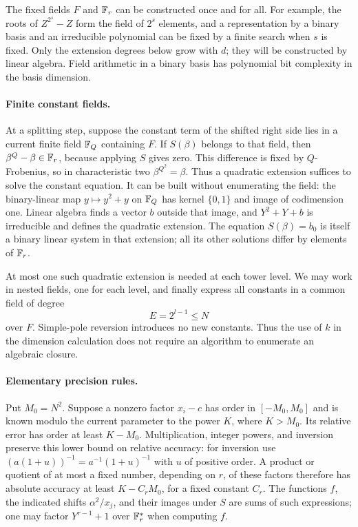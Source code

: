 The fixed fields $F$ and $\mathbb F_r$ can be constructed once and for all.
For example, the roots of $Z^{2^s}-Z$ form the field of $2^s$ elements,
and a representation by a binary basis and an irreducible polynomial
can be fixed by a finite search when $s$ is fixed.  Only the extension
degrees below grow with $d$; they will be constructed by linear algebra.
Field arithmetic in a binary basis has polynomial bit complexity in
the basis dimension.

\paragraph{Finite constant fields.}
At a splitting step, suppose the constant term of the shifted right
side lies in a current finite field $\mathbb F_Q$ containing $F$.  If
$S(\beta)$ belongs to that field, then
$\beta^Q-\beta\in\mathbb F_r$, because applying $S$ gives zero.  This difference
is fixed by $Q$-Frobenius, so in characteristic two
$\beta^{Q^2}=\beta$.  Thus a quadratic extension suffices to solve the
constant equation.  It can be built without enumerating the field:
the binary-linear map $y\mapsto y^2+y$ on $\mathbb F_Q$ has kernel
$\{0,1\}$ and image of codimension one.  Linear algebra finds a vector
$b$ outside that image, and $Y^2+Y+b$ is irreducible and defines the
quadratic extension.  The equation $S(\beta)=b_0$ is itself a binary
linear system in that extension; all its other solutions differ by
elements of $\mathbb F_r$.

At most one such quadratic extension is needed at each tower level.
We may work in nested fields, one for each level, and finally express
all constants in a common field of degree
\begin{equation}\label{eq:pencil-constant-degree}
 E=2^{l-1}\leq N
\end{equation}
over $F$.  Simple-pole reversion introduces no new constants.
Thus the use of $k$ in the dimension calculation does not require an
algorithm to enumerate an algebraic closure.

\paragraph{Elementary precision rules.}
Put $M_0=N^2$.  Suppose a nonzero factor $x_i-c$ has order in
$[-M_0,M_0]$ and is known modulo the current parameter to the power $K$,
where $K>M_0$.  Its relative error has order at least $K-M_0$.
Multiplication, integer powers, and inversion preserve this lower
bound on relative accuracy: for inversion use
$(a(1+u))^{-1}=a^{-1}(1+u)^{-1}$ with $u$ of positive order.
A product or quotient of at most a fixed number, depending on $r$,
of these factors therefore has absolute accuracy at least
$K-C_rM_0$, for a fixed constant $C_r$.
The functions $f$, the indicated shifts $\alpha^2/x_j$, and their
images under $S$ are sums of such expressions; one may factor
$Y^{r-1}+1$ over $\mathbb F_r^*$ when computing $f$.

